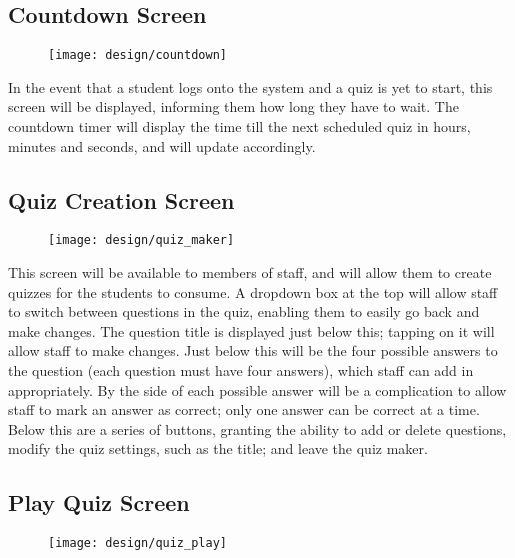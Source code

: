 \subsection{Countdown Screen}
\begin{figure}[h!]
  \texttt{[image: design/countdown]}
\end{figure}

In the event that a student logs onto the system and a quiz is yet to start, this screen will be displayed, informing them how long they have to wait. The countdown timer will display the time till the next scheduled quiz in hours, minutes and seconds, and will update accordingly.

\clearpage

\subsection{Quiz Creation Screen}
\begin{figure}[h!]
  \texttt{[image: design/quiz\_maker]}
\end{figure}

This screen will be available to members of staff, and will allow them to create quizzes for the students to consume. A dropdown box at the top will allow staff to switch between questions in the quiz, enabling them to easily go back and make changes. The question title is displayed just below this; tapping on it will allow staff to make changes. Just below this will be the four possible answers to the question (each question must have four answers), which staff can add in appropriately. By the side of each possible answer will be a complication to allow staff to mark an answer as correct; only one answer can be correct at a time. Below this are a series of buttons, granting the ability to add or delete questions, modify the quiz settings, such as the title; and leave the quiz maker.

\clearpage

\subsection{Play Quiz Screen}
\begin{figure}[h!]
  \texttt{[image: design/quiz\_play]}
\end{figure}

